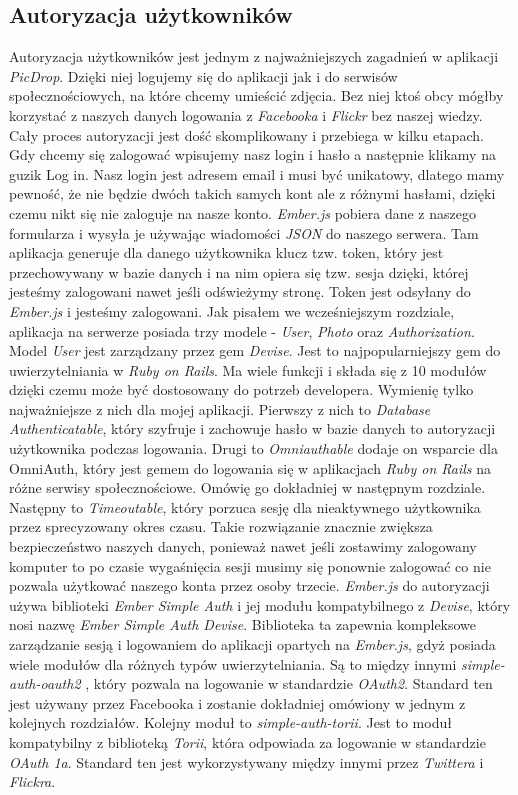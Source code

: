 \documentclass[openright]{xmgr}
\begin{document}
\subsection{Autoryzacja użytkowników}
Autoryzacja użytkowników jest jednym z najważniejszych zagadnień w aplikacji \textit{PicDrop}. Dzięki niej logujemy się do aplikacji jak i do serwisów społecznościowych, na które chcemy umieścić zdjęcia. Bez niej ktoś obcy mógłby korzystać z naszych danych logowania z \textit{Facebooka} i \textit{Flickr} bez naszej wiedzy. Cały proces autoryzacji jest dość skomplikowany i przebiega w kilku etapach. Gdy chcemy się zalogować wpisujemy nasz login i hasło a następnie klikamy na guzik Log in. Nasz login jest adresem email i musi być unikatowy, dlatego mamy pewność, że nie będzie dwóch takich samych kont ale z różnymi hasłami, dzięki czemu nikt się nie zaloguje na nasze konto. \textit{Ember.js} pobiera dane z naszego formularza i wysyła je używając wiadomości \textit{JSON} do naszego serwera. Tam aplikacja generuje dla danego użytkownika klucz tzw. token, który jest przechowywany w bazie danych i na nim opiera się tzw. sesja dzięki, której jesteśmy zalogowani nawet jeśli odświeżymy stronę. Token jest odsyłany do \textit{Ember.js} i jesteśmy zalogowani. \newline \indent Jak pisałem we wcześniejszym rozdziale, aplikacja na serwerze posiada  trzy modele - \textit{User}, \textit{Photo} oraz \textit{Authorization}. Model \textit{User} jest zarządzany przez gem \textit{Devise}. Jest to najpopularniejszy gem do uwierzytelniania w \textit{Ruby on Rails}. Ma wiele funkcji i składa się z 10 modułów dzięki czemu może być dostosowany do potrzeb developera. Wymienię tylko najważniejsze z nich dla mojej aplikacji. Pierwszy z nich to \textit{Database Authenticatable}, który szyfruje i zachowuje hasło w bazie danych to autoryzacji użytkownika podczas logowania. Drugi to \textit{Omniauthable} dodaje on wsparcie dla OmniAuth, który jest gemem do logowania się w aplikacjach \textit{Ruby on Rails} na różne serwisy społecznościowe. Omówię go dokładniej w następnym rozdziale. Następny to \textit{Timeoutable}, który porzuca sesję dla nieaktywnego użytkownika przez sprecyzowany okres czasu. Takie rozwiązanie znacznie zwiększa bezpieczeństwo naszych danych, ponieważ nawet jeśli zostawimy zalogowany komputer to po czasie wygaśnięcia sesji musimy się ponownie zalogować co nie pozwala użytkować naszego konta przez osoby trzecie.
\newline\indent \textit{Ember.js} do autoryzacji używa biblioteki \textit{Ember Simple Auth} i jej modułu kompatybilnego z \textit{Devise}, który nosi nazwę \textit{Ember Simple Auth Devise}. Biblioteka ta zapewnia kompleksowe zarządzanie sesją i logowaniem do aplikacji opartych na \textit{Ember.js}, gdyż posiada wiele modułów dla różnych typów uwierzytelniania. Są to między innymi \textit{simple-auth-oauth2 }, który pozwala na logowanie w standardzie \textit{OAuth2}. Standard ten jest używany przez Facebooka i zostanie dokładniej omówiony w jednym z kolejnych rozdziałów. Kolejny moduł to \textit{simple-auth-torii}. Jest to moduł kompatybilny z biblioteką \textit{Torii}, która odpowiada za logowanie w standardzie \textit{OAuth 1a}. Standard ten jest wykorzystywany między innymi przez \textit{Twittera} i \textit{Flickra}.
\end{document}
